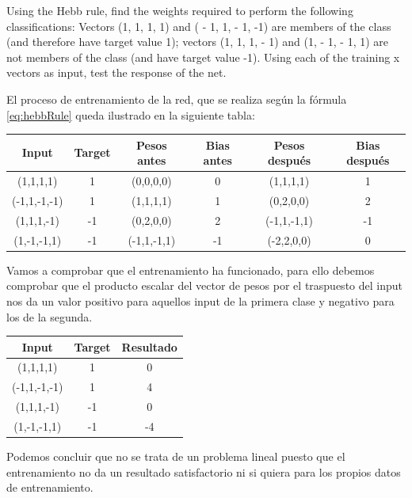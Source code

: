 \begin{problem}[5]
\ppart Using the Hebb rule, find the weights required to perform the following classifications: Vectors (1, 1, 1, 1) and ( - 1, 1, - 1, -1) are members of the class (and
therefore have target value 1); vectors (1, 1, 1, - 1) and (1, - 1, - 1, 1) are not
members of the class (and have target value -1).
\ppart Using each of the training x vectors as input, test the response of the net.
\solution

\spart
El proceso de entrenamiento de la red, que se realiza según la fórmula \ref{eq:hebbRule} queda ilustrado en la siguiente tabla:

\begin{center}
\begin{tabular}{|c|c|c|c|c|c|}
\hline
\textbf{Input} & \textbf{Target} & \textbf{Pesos antes} & \textbf{Bias antes} & \textbf{Pesos después} & \textbf{Bias después} \\
\hline
(1,1,1,1)    & 1  & (0,0,0,0) & 0 & (1,1,1,1) & 1\\
(-1,1,-1,-1) & 1  & (1,1,1,1) & 1 & (0,2,0,0) & 2\\
(1,1,1,-1)   & -1 & (0,2,0,0) & 2 & (-1,1,-1,1) & -1\\
(1,-1,-1,1)  & -1 & (-1,1,-1,1) & -1 & (-2,2,0,0) & 0\\
\hline
\end{tabular}
\end{center}

\spart
Vamos a comprobar que el entrenamiento ha funcionado, para ello debemos comprobar que el producto escalar del vector de pesos por el traspuesto del input nos da un valor positivo para aquellos input de la primera clase y negativo para los de la segunda.

\begin{center}
\begin{tabular}{|c|c|c|}
\hline
\textbf{Input} & \textbf{Target} & \textbf{Resultado} \\
\hline
(1,1,1,1)    & 1  & 0 \\
(-1,1,-1,-1) & 1  & 4 \\
(1,1,1,-1)   & -1 & 0 \\
(1,-1,-1,1)  & -1 & -4 \\
\hline
\end{tabular}
\end{center}

Podemos concluir que no se trata de un problema lineal puesto que el entrenamiento no da un resultado satisfactorio ni si quiera para los propios datos de entrenamiento.

\end{problem}

